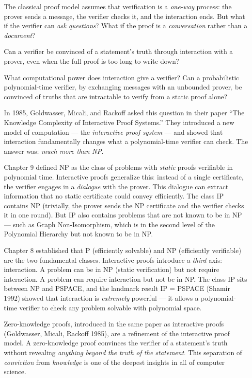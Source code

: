 The classical proof model assumes that verification is a \emph{one-way} process: the prover sends a message, the verifier checks it, and the interaction ends. But what if the verifier can \emph{ask questions}? What if the proof is a \emph{conversation} rather than a \emph{document}?

Can a verifier be convinced of a statement's truth through interaction with a prover, even when the full proof is too long to write down?

What computational power does interaction give a verifier? Can a probabilistic polynomial-time verifier, by exchanging messages with an unbounded prover, be convinced of truths that are intractable to verify from a static proof alone?

In 1985, Goldwasser, Micali, and Rackoff asked this question in their paper ``The Knowledge Complexity of Interactive Proof Systems.'' They introduced a new model of computation --- the \emph{interactive proof system} --- and showed that interaction fundamentally changes what a polynomial-time verifier can check. The answer was: \emph{much more than NP}.

Chapter 9 defined NP as the class of problems with \emph{static} proofs verifiable in polynomial time. Interactive proofs generalize this: instead of a single certificate, the verifier engages in a \emph{dialogue} with the prover. This dialogue can extract information that no static certificate could convey efficiently. The class IP contains NP (trivially, the prover sends the NP certificate and the verifier checks it in one round). But IP also contains problems that are not known to be in NP --- such as Graph Non-Isomorphism, which is in the second level of the Polynomial Hierarchy but not known to be in NP.

Chapter 8 established that P (efficiently solvable) and NP (efficiently verifiable) are the two fundamental classes. Interactive proofs introduce a \emph{third} axis: interaction. A problem can be in NP (static verification) but not require interaction. A problem can require interaction but not be in NP. The class IP sits between NP and PSPACE, and the landmark result IP = PSPACE (Shamir 1992) showed that interaction is \emph{extremely} powerful --- it allows a polynomial-time verifier to check any problem solvable with polynomial space.

Zero-knowledge proofs, introduced in the same paper as interactive proofs (Goldwasser, Micali, Rackoff 1985), are a refinement of the interactive proof model. A zero-knowledge proof convinces the verifier of a statement's truth without revealing \emph{anything beyond the truth of the statement}. This separation of \emph{conviction} from \emph{knowledge} is one of the deepest insights in all of computer science.

